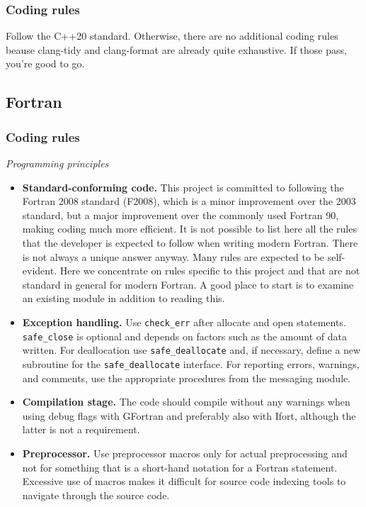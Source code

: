 \documentclass{article}
\begin{document}
\subsubsection{Coding rules}

Follow the C++20 standard. Otherwise, there are no additional coding rules beause clang-tidy and clang-format are already quite exhaustive. If those pass, you're good to go.

\subsection{Fortran}

\subsubsection{Coding rules}

\textit{Programming principles}

\begin{itemize}
\item \textbf{Standard-conforming code.} This project is committed to following the Fortran 2008 standard (F2008), which is a minor improvement over the 2003 standard, but a major improvement over the commonly used Fortran 90, making coding much more efficient. It is not possible to list here all the rules that the developer is expected to follow when writing modern Fortran. There is not always a unique answer anyway. Many rules are expected to be self-evident. Here we concentrate on rules specific to this project and that are not standard in general for modern Fortran. A good place to start is to examine an existing module in addition to reading this.
\item \textbf{Exception handling.} Use \verb+check_err+ after allocate and open statements. \verb+safe_close+ is optional and depends on factors such as the amount of data written. For deallocation use \verb+safe_deallocate+ and, if necessary, define a new subroutine for the \verb+safe_deallocate+ interface. For reporting errors, warnings, and comments, use the appropriate procedures from the messaging module.
\item \textbf{Compilation stage.} The code should compile without any warnings when using debug flags with GFortran and preferably also with Ifort, although the latter is not a requirement.
\item \textbf{Preprocessor.} Use preprocessor macros only for actual preprocessing and not for something that is a short-hand notation for a Fortran statement. Excessive use of macros makes it difficult for source code indexing tools to navigate through the source code.
\end{itemize}
\end{document}
